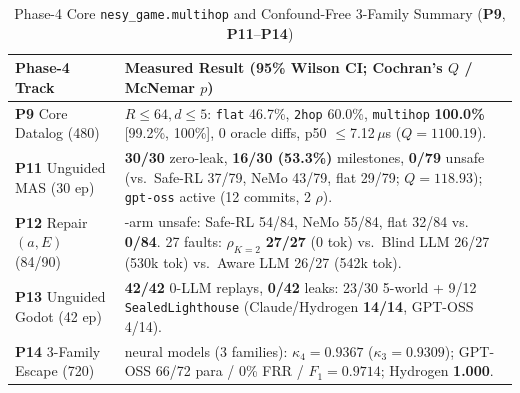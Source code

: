 \begin{table}[!tbp]
\caption{Phase-4 Core \texttt{nesy\_game.multihop} and Confound-Free 3-Family Summary (\textbf{P9}, \textbf{P11}--\textbf{P14})}
\label{tab:phase4-compact}
\centering
\scriptsize
\setlength{\tabcolsep}{3pt}
\begin{tabularx}{\columnwidth}{@{}>{\raggedright\arraybackslash}p{}>{\raggedright\arraybackslash}X@{}}
\toprule
\textbf{Phase-4 Track} & \textbf{Measured Result (95\% Wilson CI; Cochran's $Q$ / McNemar $p$)} \\
\midrule
\textbf{P9} Core Datalog (480) & $R{\le}64, d{\le}5$: \texttt{flat} 46.7\%, \texttt{2hop} 60.0\%, \texttt{multihop} \textbf{100.0\%} [99.2\%, 100\%], 0 oracle diffs, p50 $\le$7.12\,$\mu$s ($Q{=}1100.19$). \\
\textbf{P11} Unguided MAS (30 ep) & \textbf{30/30} zero-leak, \textbf{16/30 (53.3\%)} milestones, \textbf{0/79} unsafe (vs.\ Safe-RL 37/79, NeMo 43/79, flat 29/79; $Q{=}118.93$); \texttt{gpt-oss} active (12 commits, 2 $\rho$). \\
\textbf{P12} Repair $(a, E)$ (84/90) & 7-arm unsafe: Safe-RL 54/84, NeMo 55/84, flat 32/84 vs.\ \system{} \textbf{0/84}. 27 faults: $\rho_{K=2}$ \textbf{27/27} (0 tok) vs.\ Blind LLM 26/27 (530k tok) vs.\ Aware LLM 26/27 (542k tok). \\
\textbf{P13} Unguided Godot (42 ep) & \textbf{42/42} 0-LLM replays, \textbf{0/42} leaks: 23/30 5-world + 9/12 \texttt{SealedLighthouse} (Claude/Hydrogen \textbf{14/14}, GPT-OSS 4/14). \\
\textbf{P14} 3-Family Escape (720) & 4 neural models (3 families): $\kappa_{4}{=}\mathbf{0.9367}$ ($\kappa_{3}{=}\mathbf{0.9309}$); GPT-OSS 66/72 para / 0\% FRR / $F_1{=}0.9714$; Hydrogen \textbf{1.000}. \\
\bottomrule
\end{tabularx}
\end{table}
